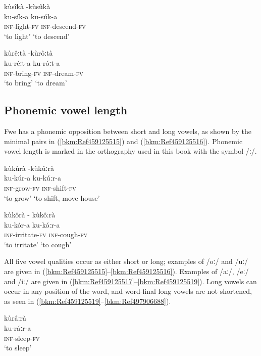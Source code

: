 \ea
kùsîkà  \tab\tab    -\tab  kùsûkà\\
ku-sík-a  \tab \tab\tab   ku-súk-a\\
\textsc{inf}-light-\textsc{fv}   \tab\tab   \textsc{inf}-descend-\textsc{fv}\\
\glt ‘to light’  \tab\tab    ‘to descend’
\z

\ea
\label{bkm:Ref98513665}
kùrêːtà   \tab\tab -\tab  kùrôːtà\\
ku-réːt-a   \tab\tab   ku-róːt-a\\
\textsc{inf}-bring-\textsc{fv}   \tab\tab   \textsc{inf}-dream-\textsc{fv}\\
\glt ‘to bring’  \tab\tab    ‘to dream’
\z
\subsection{Phonemic vowel length}
\label{bkm:Ref459132406}\label{bkm:Ref451506997}\hypertarget{Toc75352605}{}
Fwe has a phonemic opposition between short and long vowels, as shown by the mini\-mal pairs in (\ref{bkm:Ref459125515}) and (\ref{bkm:Ref459125516}). Phonemic vowel length is marked in the orthography used in this book with the sym\-bol /ː/.

\ea
\label{bkm:Ref459125515}
kùkûrà   \tab\tab -\tab  kùkûːrà\\
ku-kúr-a   \tab\tab   ku-kúːr-a\\
\textsc{inf}-grow-\textsc{fv}   \tab\tab   \textsc{inf}-shift-\textsc{fv}\\
\glt ‘to grow’   \tab\tab   ‘to shift, move house’
\z

\ea
\label{bkm:Ref459125516}
kùkôrà \tab\tab   - \tab kùkôːrà\\
ku-kór-a   \tab\tab   ku-kóːr-a\\
\textsc{inf}-irritate-\textsc{fv}  \tab\tab  \textsc{inf}-cough-\textsc{fv}\\
\glt ‘to irritate’   \tab\tab   ‘to cough’
\z

All five vowel qualities occur as either short or long; examples of /oː/ and /uː/ are given in (\ref{bkm:Ref459125515}--\ref{bkm:Ref459125516}). Examples of /aː/, /eː/ and /iː/ are given in (\ref{bkm:Ref459125517}--\ref{bkm:Ref459125519}). Long vowels can occur in any position of the word, and word-final long vowels are not shortened, as seen in (\ref{bkm:Ref459125519}--\ref{bkm:Ref497906688}).

\ea
\label{bkm:Ref459125517}
\glll kùrâːrà\\
ku-ráːr-a\\
\textsc{inf}-sleep-\textsc{fv}\\
\glt ‘to sleep’
\z

